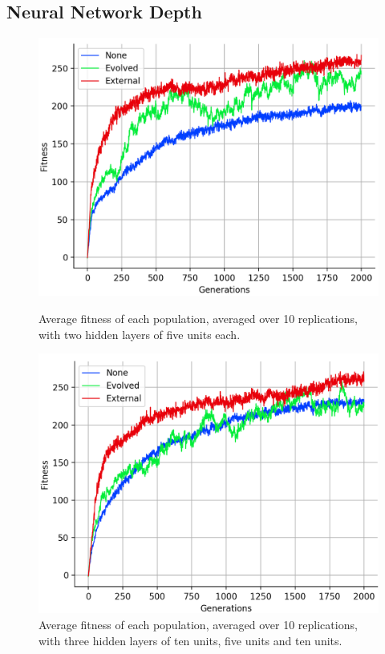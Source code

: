 \documentclass[12pt,a4paper]{report}
\begin{document}
\subsection{Neural Network Depth}

\begin{figure}[t]
   \centering
   \begin{minipage}{0.49\textwidth}
          \centering
          \captionsetup{width=.9\linewidth}
          \includegraphics[width=1.\linewidth]{results/average-55.png}
          \caption{Average fitness of each population, averaged over 10 replications, with two hidden layers of five units each.}
          \label{fig:average-55}
   \end{minipage}
   \begin{minipage}{0.49\textwidth}
          \centering
          \captionsetup{width=.9\linewidth}
          \includegraphics[width=1.\linewidth]{results/average-10510.png}
          \caption{Average fitness of each population, averaged over 10 replications, with three hidden layers of ten units, five units and ten units.}
          \label{fig:average-10510}
   \end{minipage}
\end{figure}
\end{document}
